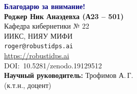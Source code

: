 \documentclass[10pt,aspectratio=169]{beamer}
\newcommand{\bn}[1]{\textcolor{navy}{\textbf{#1}}}
\begin{document}
\begin{frame}[plain]
\begin{center}
\vspace{1.0cm}
{\Huge\bn{Благодарю за внимание!}}\\[1.5cm]

{\large \textbf{Роджер Ник Анаэдевха (А23 -- 501)}}\\[0.3cm]
Кафедра кибернетики № 22\\
ИИКС, НИЯУ МИФИ\\[0.5cm]

\texttt{roger@robustidps.ai}\\
\url{https://robustidps.ai}\\
DOI:~10.5281/zenodo.19129512\\[1.0cm]

\textbf{Научный руководитель:} Трофимов А.\,Г.\\
(к.т.н., доцент)
\end{center}
\end{frame}
\end{document}
